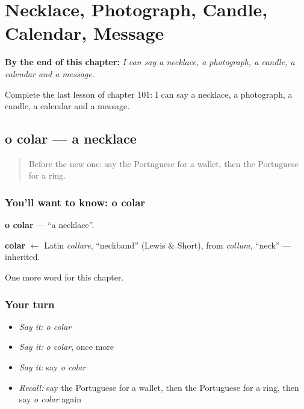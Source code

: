 
\chapter{Necklace, Photograph, Candle, Calendar, Message}
\label{ch:pt-necklace-photograph-candle-calendar-message}

\begin{chapteropening}
\textbf{By the end of this chapter:} \emph{I can say a necklace, a photograph, a candle, a calendar and a message.}

Complete the last lesson of chapter 101: I can say a necklace, a photograph, a candle, a calendar and a message.
\end{chapteropening}

\section[o colar]{o colar — a necklace}

\label{lesson:PT-C101-colar}



\begin{quote}
Before the new one: say the Portuguese for a wallet, then the Portuguese for a ring.
\end{quote}

\subsection*{You'll want to know: o colar}
\textbf{o colar} — \textquotedblleft{}a necklace\textquotedblright{}.

\begin{cousinweb}
\textbf{colar} $\leftarrow$ Latin \emph{collare}, \textquotedblleft{}neckband\textquotedblright{} (Lewis \& Short), from \emph{collum}, \textquotedblleft{}neck\textquotedblright{} — inherited.
\end{cousinweb}

\begin{grammarlens}[title={What you've built}]
One more word for this chapter.
\end{grammarlens}

\subsection*{Your turn}
\begin{itemize}
\raggedright
  \item \emph{Say it:} \emph{o colar}
  \item \emph{Say it:} \emph{o colar}, once more
  \item \emph{Say it:} say \emph{o colar}
  \item \emph{Recall:} say the Portuguese for a wallet, then the Portuguese for a ring, then say \emph{o colar} again
\end{itemize}

